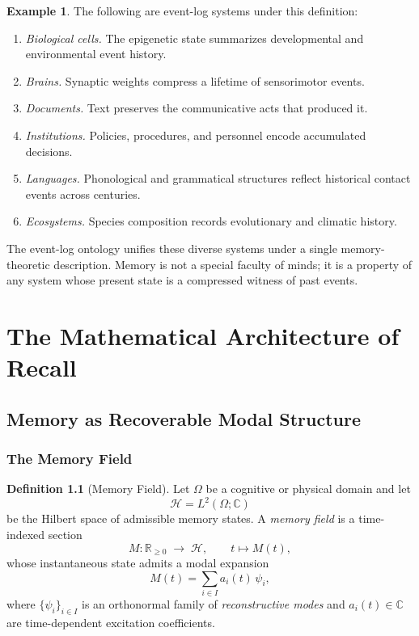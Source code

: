 \documentclass[12pt, oneside]{book}
\theoremstyle{plain}
\theoremstyle{definition}
\newtheorem{definition}[theorem]{Definition}
\newtheorem{example}[theorem]{Example}
\theoremstyle{remark}
\newcommand{\calH}{\mathcal{H}}
\newcommand{\RR}{\mathbb{R}}
\newcommand{\CC}{\mathbb{C}}
\begin{document}
\begin{example}
The following are event-log systems under this definition:
\begin{enumerate}
\item \emph{Biological cells.} The epigenetic state summarizes
      developmental and environmental event history.
\item \emph{Brains.} Synaptic weights compress a lifetime
      of sensorimotor events.
\item \emph{Documents.} Text preserves the communicative
      acts that produced it.
\item \emph{Institutions.} Policies, procedures, and
      personnel encode accumulated decisions.
\item \emph{Languages.} Phonological and grammatical structures
      reflect historical contact events across centuries.
\item \emph{Ecosystems.} Species composition records
      evolutionary and climatic history.
\end{enumerate}
\end{example}

The event-log ontology unifies these diverse systems under
a single memory-theoretic description.
Memory is not a special faculty of minds; it is a property
of any system whose present state is a compressed witness
of past events.

\part{The Mathematical Architecture of Recall}

\chapter{Memory as Recoverable Modal Structure}

\section{The Memory Field}

\begin{definition}[Memory Field]
\label{def:memory-field}
Let $\Omega$ be a cognitive or physical domain and let
\[
  \calH = L^2(\Omega;\CC)
\]
be the Hilbert space of admissible memory states.
A \emph{memory field} is a time-indexed section
\[
  M : \RR_{\geq 0} \;\longrightarrow\; \calH,
  \qquad t \mapsto M(t),
\]
whose instantaneous state admits a modal expansion
\[
  M(t) = \sum_{i \in I} a_i(t)\,\psi_i,
\]
where $\{\psi_i\}_{i \in I}$ is an orthonormal family
of \emph{reconstructive modes} and $a_i(t) \in \CC$
are time-dependent excitation coefficients.
\end{definition}
\end{document}
